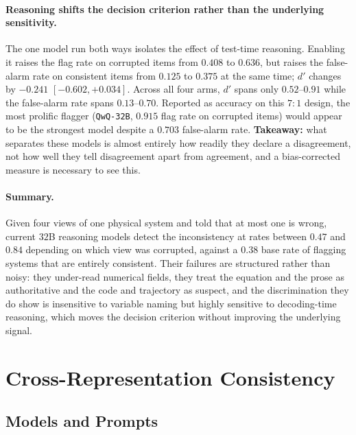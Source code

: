 \paragraph{Reasoning shifts the decision criterion rather than the underlying
sensitivity.}
The one model run both ways isolates the effect of test-time reasoning. Enabling it
raises the flag rate on corrupted items from $0.408$ to $0.636$, but raises the
false-alarm rate on consistent items from $0.125$ to $0.375$ at the same time; $d'$
changes by $-0.241$ $[-0.602, +0.034]$. Across all four arms, $d'$ spans only
$0.52$--$0.91$ while the false-alarm rate spans $0.13$--$0.70$. Reported as accuracy
on this $7{:}1$ design, the most prolific flagger (\texttt{QwQ-32B}, $0.915$ flag
rate on corrupted items) would appear to be the strongest model despite a $0.703$
false-alarm rate. \textbf{Takeaway:} what separates these models is almost entirely
how readily they declare a disagreement, not how well they tell disagreement apart
from agreement, and a bias-corrected measure is necessary to see this.

\paragraph{Summary.}
Given four views of one physical system and told that at most one is wrong, current
$32$B reasoning models detect the inconsistency at rates between $0.47$ and $0.84$
depending on which view was corrupted, against a $0.38$ base rate of flagging
systems that are entirely consistent. Their failures are structured rather than
noisy: they under-read numerical fields, they treat the equation and the prose as
authoritative and the code and trajectory as suspect, and the discrimination they do
show is insensitive to variable naming but highly sensitive to decoding-time
reasoning, which moves the decision criterion without improving the underlying
signal.

\section{Cross-Representation Consistency}
\label{app:cross_representation}

\subsection{Models and Prompts}
\label{app:xr_models_prompts}

